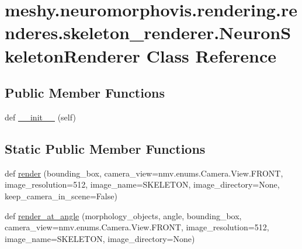 \hypertarget{classmeshy_1_1neuromorphovis_1_1rendering_1_1renderes_1_1skeleton__renderer_1_1NeuronSkeletonRenderer}{}\section{meshy.\+neuromorphovis.\+rendering.\+renderes.\+skeleton\+\_\+renderer.\+Neuron\+Skeleton\+Renderer Class Reference}
\label{classmeshy_1_1neuromorphovis_1_1rendering_1_1renderes_1_1skeleton__renderer_1_1NeuronSkeletonRenderer}


 


\subsection*{Public Member Functions}
\begin{DoxyCompactItemize}
\item 
def \hyperlink{classmeshy_1_1neuromorphovis_1_1rendering_1_1renderes_1_1skeleton__renderer_1_1NeuronSkeletonRenderer_a74ec01435b898e1a41c5d204e3f74d9d}{\+\_\+\+\_\+init\+\_\+\+\_\+} (self)\hypertarget{classmeshy_1_1neuromorphovis_1_1rendering_1_1renderes_1_1skeleton__renderer_1_1NeuronSkeletonRenderer_a74ec01435b898e1a41c5d204e3f74d9d}{}\label{classmeshy_1_1neuromorphovis_1_1rendering_1_1renderes_1_1skeleton__renderer_1_1NeuronSkeletonRenderer_a74ec01435b898e1a41c5d204e3f74d9d}

\end{DoxyCompactItemize}
\subsection*{Static Public Member Functions}
\begin{DoxyCompactItemize}
\item 
def \hyperlink{classmeshy_1_1neuromorphovis_1_1rendering_1_1renderes_1_1skeleton__renderer_1_1NeuronSkeletonRenderer_a0d0fdf336d70dce5db6d4f26aa5464c0}{render} (bounding\+\_\+box, camera\+\_\+view=nmv.\+enums.\+Camera.\+View.\+F\+R\+O\+NT, image\+\_\+resolution=512, image\+\_\+name=\textquotesingle{}S\+K\+E\+L\+E\+T\+ON\textquotesingle{}, image\+\_\+directory=None, keep\+\_\+camera\+\_\+in\+\_\+scene=False)
\item 
def \hyperlink{classmeshy_1_1neuromorphovis_1_1rendering_1_1renderes_1_1skeleton__renderer_1_1NeuronSkeletonRenderer_a64ca8366e5557573c4916a93dab14088}{render\+\_\+at\+\_\+angle} (morphology\+\_\+objects, angle, bounding\+\_\+box, camera\+\_\+view=nmv.\+enums.\+Camera.\+View.\+F\+R\+O\+NT, image\+\_\+resolution=512, image\+\_\+name=\textquotesingle{}S\+K\+E\+L\+E\+T\+ON\textquotesingle{}, image\+\_\+directory=None)
\end{DoxyCompactItemize}



